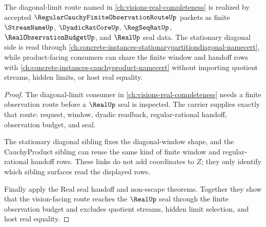 \begin{theorem}
\label{thm:regular-cauchy-finite-observation-route-vision-concretization}
The diagonal-limit route named in \autoref{ch:visions-real-completeness} is realized by accepted $\RegularCauchyFiniteObservationRouteUp$ packets as finite $\StreamNameUp$, $\DyadicRatCoreUp$, $\RegSeqRatUp$, $\RealObservationBudgetUp$, and $\RealUp$ seal data. The stationary diagonal side is read through \autoref{ch:concrete-instances-stationarypartitiondiagonal-namecert}, while product-facing consumers can share the finite window and handoff rows with \autoref{ch:concrete-instances-cauchyproduct-namecert} without importing quotient streams, hidden limits, or host real equality.
\end{theorem}
\begin{proof}
The diagonal-limit consumer in \autoref{ch:visions-real-completeness} needs a finite observation route before a $\RealUp$ seal is inspected. The carrier supplies exactly that route: request, window, dyadic readback, regular-rational handoff, observation budget, and seal.

The stationary diagonal sibling fixes the diagonal-window shape, and the CauchyProduct sibling can reuse the same kind of finite window and regular-rational handoff rows. These links do not add coordinates to $Z$; they only identify which sibling surfaces read the displayed rows.

Finally apply the Real seal handoff and non-escape theorems. Together they show that the vision-facing route reaches the $\RealUp$ seal through the finite observation budget and excludes quotient streams, hidden limit selection, and host real equality.
\end{proof}

